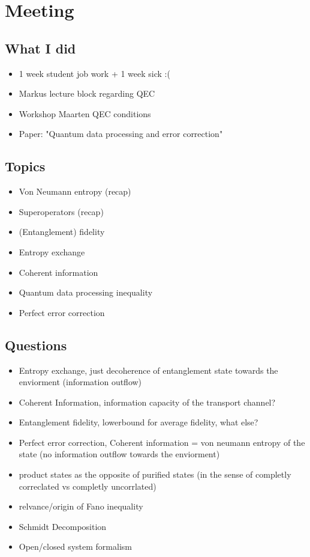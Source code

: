 \section{Meeting}

\subsection{What I did}
\begin{itemize}
    \item 1 week student job work + 1 week sick :(
    \item Markus lecture block regarding QEC
    \item Workshop Maarten QEC conditions
    \item Paper: "Quantum data processing and error correction"
\end{itemize}

\subsection{Topics}
\begin{itemize}
    \item Von Neumann entropy  (recap)
    \item Superoperators (recap)
    \item (Entanglement) fidelity
    \item Entropy exchange 
    \item Coherent information
    \item Quantum data processing inequality
    \item Perfect error correction 
\end{itemize}

\subsection{Questions}
\begin{itemize}
    \item Entropy exchange, just decoherence of entanglement state towards the enviorment (information outflow)
    \item Coherent Information, information capacity of the transport channel?
    \item Entanglement fidelity, lowerbound for average fidelity, what else?
    \item Perfect error correction, Coherent information = von neumann entropy of the state (no information outflow towards the enviorment)
    \item product states as the opposite of purified states (in the sense of completly correclated vs completly uncorrlated)
    \item relvance/origin of Fano inequality
    \item Schmidt Decomposition 
    \item Open/closed system formalism
\end{itemize}

